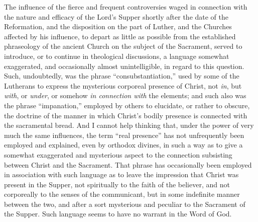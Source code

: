 \documentclass[
  english,
]{book}
\begin{document}
The influence of the fierce and frequent controversies waged in connection with the nature and efficacy of the Lord's Supper shortly after the date of the Reformation, and the disposition on the part of Luther, and the Churches affected by his influence, to depart as little as possible from the established phraseology of the ancient Church on the subject of the Sacrament, served to introduce, or to continue in theological discussions, a language somewhat exaggerated, and occasionally almost unintelligible, in regard to this question. Such, undoubtedly, was the phrase ``consubstantiation,'' used by some of the Lutherans to express the mysterious corporeal presence of Christ, not \emph{in}, but \emph{with}, or \emph{under}, or somehow \emph{in connection with} the elements; and such also was the phrase ``impanation,'' employed by others to elucidate, or rather to obscure, the doctrine of the manner in which Christ's bodily presence is connected with the sacramental bread. And I cannot help thinking that, under the power of very much the same influences, the term ``real presence'' has not unfrequently been employed and explained, even by orthodox divines, in such a way as to give a somewhat exaggerated and mysterious aspect to the connection subsisting between Christ and the Sacrament. That phrase has occasionally been employed in association with such language as to leave the impression that Christ was present in the Supper, not spiritually to the faith of the believer, and not corporeally to the senses of the communicant, but in some indefinite manner between the two, and after a sort mysterious and peculiar to the Sacrament of the Supper. Such language seems to have no warrant in the Word of God.
\end{document}
